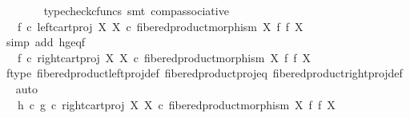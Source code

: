 \begin{isabellebody}
\ \ \ \ \ \ \isamarkupfalse%
\ {\isacharparenleft}{\kern0pt}typecheck{\isacharunderscore}{\kern0pt}cfuncs{\isacharcomma}{\kern0pt}\ smt\ comp{\isacharunderscore}{\kern0pt}associative{}{\isacharparenright}{\kern0pt}\isanewline
\ \ \ \ \isamarkupfalse%
\ \isamarkupfalse%
\ {\isachardoublequoteopen}{\isachardot}{\kern0pt}{\isachardot}{\kern0pt}{\isachardot}{\kern0pt}\ {\isacharequal}{\kern0pt}\ f\ {\isasymcirc}\isactrlsub c\ left{\isacharunderscore}{\kern0pt}cart{\isacharunderscore}{\kern0pt}proj\ X\ X\ {\isasymcirc}\isactrlsub c\ fibered{\isacharunderscore}{\kern0pt}product{\isacharunderscore}{\kern0pt}morphism\ X\ f\ f\ X{\isachardoublequoteclose}\isanewline
\ \ \ \ \ \ \isamarkupfalse%
\ {\isacharparenleft}{\kern0pt}simp\ add{\isacharcolon}{\kern0pt}\ h{\isacharunderscore}{\kern0pt}g{\isacharunderscore}{\kern0pt}eq{\isacharunderscore}{\kern0pt}f{\isacharparenright}{\kern0pt}\isanewline
\ \ \ \ \isamarkupfalse%
\ \isamarkupfalse%
\ {\isachardoublequoteopen}{\isachardot}{\kern0pt}{\isachardot}{\kern0pt}{\isachardot}{\kern0pt}\ {\isacharequal}{\kern0pt}\ f\ {\isasymcirc}\isactrlsub c\ right{\isacharunderscore}{\kern0pt}cart{\isacharunderscore}{\kern0pt}proj\ X\ X\ {\isasymcirc}\isactrlsub c\ fibered{\isacharunderscore}{\kern0pt}product{\isacharunderscore}{\kern0pt}morphism\ X\ f\ f\ X{\isachardoublequoteclose}\isanewline
\ \ \ \ \ \ \isamarkupfalse%
\ f{\isacharunderscore}{\kern0pt}type\ fibered{\isacharunderscore}{\kern0pt}product{\isacharunderscore}{\kern0pt}left{\isacharunderscore}{\kern0pt}proj{\isacharunderscore}{\kern0pt}def\ fibered{\isacharunderscore}{\kern0pt}product{\isacharunderscore}{\kern0pt}proj{\isacharunderscore}{\kern0pt}eq\ fibered{\isacharunderscore}{\kern0pt}product{\isacharunderscore}{\kern0pt}right{\isacharunderscore}{\kern0pt}proj{\isacharunderscore}{\kern0pt}def\ \isamarkupfalse%
\ auto\isanewline
\ \ \ \ \isamarkupfalse%
\ \isamarkupfalse%
\ {\isachardoublequoteopen}{\isachardot}{\kern0pt}{\isachardot}{\kern0pt}{\isachardot}{\kern0pt}\ {\isacharequal}{\kern0pt}\ {\isacharparenleft}{\kern0pt}h\ {\isasymcirc}\isactrlsub c\ g{\isacharparenright}{\kern0pt}\ {\isasymcirc}\isactrlsub c\ right{\isacharunderscore}{\kern0pt}cart{\isacharunderscore}{\kern0pt}proj\ X\ X\ {\isasymcirc}\isactrlsub c\ fibered{\isacharunderscore}{\kern0pt}product{\isacharunderscore}{\kern0pt}morphism\ X\ f\ f\ X{\isachardoublequoteclose}\isanewline
\ \ \ \ \ \ \isamarkupfalse%

\end{isabellebody}
